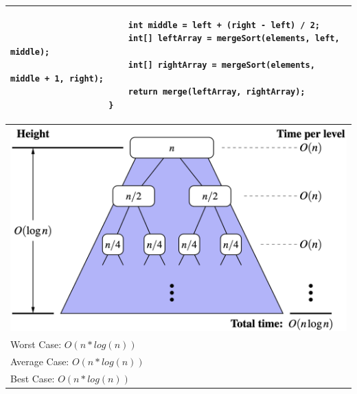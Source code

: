 \documentclass[a4paper, landscape, 8pt]{scrartcl}
\begin{document}
\begin{multicols*}{4}
\begin{tabular}{|l|}
\begin{lstlisting}
                        int middle = left + (right - left) / 2;
                        int[] leftArray = mergeSort(elements, left, middle);
                        int[] rightArray = mergeSort(elements, middle + 1, right);
                        return merge(leftArray, rightArray);
                    }
                    \end{lstlisting} \\
                    \hline
                    \includegraphics[scale=0.12]{graphic/05_laufzeit_mergesort} \\
                    \hline
                    Worst Case: $O(n*log(n))$ \\
                    Average Case: $O(n*log(n))$ \\
                    Best Case: $O(n*log(n))$ \\
                    \hline
                \end{tabular}


\end{multicols*}
\end{document}
